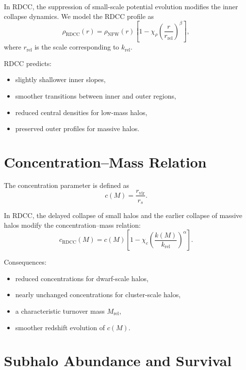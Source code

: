 \documentclass[11pt,a4paper]{article}
\begin{document}
In RDCC, the suppression of small-scale potential evolution modifies the inner 
collapse dynamics. We model the RDCC profile as
\begin{equation}
    \rho_{\mathrm{RDCC}}(r)
    = \rho_{\mathrm{NFW}}(r)
      \left[1 - \chi_{\rho}
      \left(\frac{r}{r_{\mathrm{rel}}}\right)^{\beta}\right],
\end{equation}
where $r_{\mathrm{rel}}$ is the scale corresponding to $k_{\mathrm{rel}}$.

RDCC predicts:
\begin{itemize}[leftmargin=1.2cm]
    \item slightly shallower inner slopes,
    \item smoother transitions between inner and outer regions,
    \item reduced central densities for low-mass halos,
    \item preserved outer profiles for massive halos.
\end{itemize}
\section{Concentration--Mass Relation}

The concentration parameter is defined as
\begin{equation}
    c(M) = \frac{r_{\mathrm{vir}}}{r_{s}}.
\end{equation}

In RDCC, the delayed collapse of small halos and the earlier collapse of massive 
halos modify the concentration--mass relation:
\begin{equation}
    c_{\mathrm{RDCC}}(M)
    = c(M)
      \left[1 - \chi_{c}
      \left(\frac{k(M)}{k_{\mathrm{rel}}}\right)^{\alpha}\right].
\end{equation}

Consequences:
\begin{itemize}[leftmargin=1.2cm]
    \item reduced concentrations for dwarf-scale halos,
    \item nearly unchanged concentrations for cluster-scale halos,
    \item a characteristic turnover mass $M_{\mathrm{rel}}$,
    \item smoother redshift evolution of $c(M)$.
\end{itemize}
\section{Subhalo Abundance and Survival}
\end{document}
